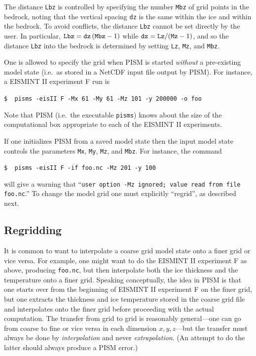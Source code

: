 \documentclass[11pt,final]{amsart}
\renewcommand{\t}[1]{\texttt{#1}}
\begin{document}
The distance \t{Lbz} is controlled by specifying the number \verb|Mbz| of grid points in the bedrock, noting that the vertical spacing \t{dz} is the same within the ice and within the bedrock.  To avoid conflicts, the distance \t{Lbz} cannot be set directly by the user.  In particular, $\text{\t{Lbz}}=\text{\t{dz}}\,(\text{\t{Mbz}}-1)$ while $\text{\t{dz}} = \text{\t{Lz}} / (\text{\t{Mz}}-1)$, and so the distance \t{Lbz} into the bedrock is determined by setting \t{Lz}, \t{Mz}, and \t{Mbz}.

One is allowed to specify the grid when PISM is started \emph{without} a pre-existing model state (i.e.~as stored in a NetCDF input file output by PISM).  For instance, a EISMINT II experiment F \cite{EISMINT00} run is

\verb|$  pisms -eisII F -Mx 61 -My 61 -Mz 101 -y 200000 -o foo|

\noindent Note that PISM (i.e.~the executable \verb|pisms|) knows about the size of the computational box appropriate to each of the EISMINT II experiments.

If one initializes PISM from a saved model state then the input model state controls the parameters \t{Mx}, \t{My}, \t{Mz}, and \t{Mbz}.  For instance, the command

\verb|$  pisms -eisII F -if foo.nc -Mz 201 -y 100|

\noindent will give a warning that ``\verb|user option -Mz ignored; value read from file foo.nc|.''  To change the model grid one must explicitly ``regrid'', as described next.

\subsection{Regridding}  It is common to want to interpolate a coarse grid model state onto a finer grid or vice versa.  For example, one might want to do the EISMINT II experiment F as above, producing \verb|foo.nc|, but then interpolate both the ice thickness and the temperature onto a finer grid.  Speaking conceptually, the idea in PISM is that one starts over from the beginning of EISMINT II experiment F on the finer grid, but one extracts the thickness and ice temperature stored in the coarse grid file and interpolates onto the finer grid before proceeding with the actual computation.  The transfer from grid to grid is reasonably general---one can go from coarse to fine or vice versa in each dimension $x,y,z$---but the transfer must always be done by \emph{interpolation} and never \emph{extrapolation}.  (An attempt to do the latter should always produce a PISM error.)
\end{document}
